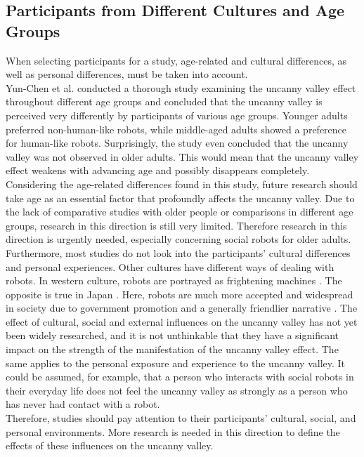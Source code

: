 \subsection{Participants from Different Cultures and Age Groups}
When selecting participants for a study, age-related and cultural differences, as well as personal differences, must be taken into account.\\
Yun-Chen et al. \cite{age_differences} conducted a thorough study examining the uncanny valley effect throughout different age groups and concluded that the uncanny valley is perceived very differently by participants of various age groups. Younger adults
preferred non-human-like robots, while middle-aged adults showed a preference for human-like robots. Surprisingly, the study even concluded that the uncanny valley was not observed in older adults. This would mean that the uncanny valley effect weakens with advancing age and possibly disappears completely. Considering the age-related differences found in this study, future research should take age as an essential factor that profoundly affects the uncanny valley. Due to the lack of comparative studies with older people or comparisons in different age groups, research in this direction is still very limited. Therefore research in this direction is urgently needed, especially concerning social robots for older adults.\\
Furthermore, most studies do not look into the participants' cultural differences and personal experiences. Other cultures have different ways of dealing with robots. In western culture, robots are portrayed as frightening machines \cite{japan_robot_friendly}. The opposite is true in Japan \cite{japan_robot_friendly}. Here, robots are much more accepted and widespread in society due to government promotion and a generally friendlier narrative \cite{japan_robot_friendly}. The effect of cultural, social and external influences on the uncanny valley has not yet been widely researched, and it is not unthinkable that they have a significant impact on the strength of the manifestation of the uncanny valley effect. The same applies to the personal exposure and experience to the uncanny valley. It could be assumed, for example, that a person who interacts with social robots in their everyday life does not feel the uncanny valley as strongly as a person who has never had contact with a robot.\\
Therefore, studies should pay attention to their participants' cultural, social, and personal environments. More research is needed in this direction to define the effects of these influences on the uncanny valley.





